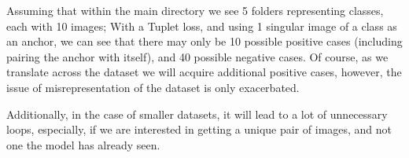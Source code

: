 \documentclass[
	letterpaper, %
	10pt, %
	unnumberedsections, %
	twoside, %
]{LTJournalArticle}
\begin{document}
Assuming that within the main directory we see 5 folders representing classes, each with 10 images; With a Tuplet loss, and using 1 singular image of a class as an anchor, we can see that there may only be 10 possible positive cases (including pairing the anchor with itself), and 40 possible negative cases. Of course, as we translate across the dataset we will acquire additional positive cases, however, the issue of misrepresentation of the dataset is only exacerbated.  %


Additionally, in the case of smaller datasets, it will lead to a lot of unnecessary loops, especially, if we are interested in getting a unique pair of images, and not one the model has already seen.

\end{document}
